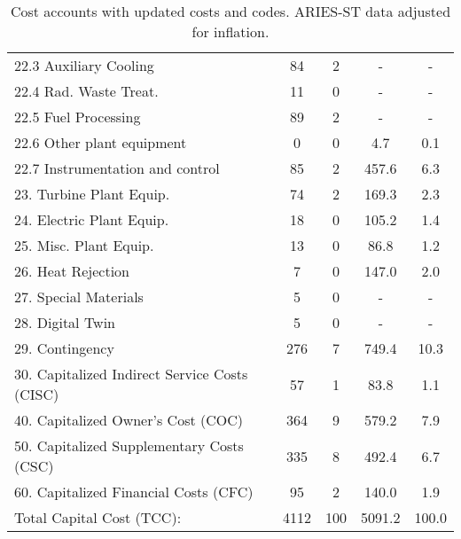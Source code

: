 \begin{table}[h!]
{\begin{tabular}{lcccc}
\hspace{10mm}22.3 Auxiliary Cooling & 84 & 2 & - & - \\
\hspace{10mm}22.4 Rad. Waste Treat. & 11 & 0 & - & - \\
\hspace{10mm}22.5 Fuel Processing & 89 & 2 & - & - \\
\hspace{10mm}22.6 Other plant equipment & 0 & 0 & 4.7 & 0.1 \\
\hspace{10mm}22.7 Instrumentation and control & 85 & 2 & 457.6 & 6.3 \\
\hspace{5mm}23. Turbine Plant Equip. & 74 & 2 & 169.3 & 2.3 \\
\hspace{5mm}24. Electric Plant Equip. & 18 & 0 & 105.2 & 1.4 \\
\hspace{5mm}25. Misc. Plant Equip. & 13 & 0 & 86.8 & 1.2 \\
\hspace{5mm}26. Heat Rejection & 7 & 0 & 147.0 & 2.0 \\
\hspace{5mm}27. Special Materials & 5 & 0 & - & - \\
\hspace{5mm}28. Digital Twin & 5 & 0 & - & - \\
\hspace{5mm}29. Contingency & 276 & 7 & 749.4 & 10.3 \\
30. Capitalized Indirect Service Costs (CISC) & 57 & 1 & 83.8 & 1.1 \\
40. Capitalized Owner’s Cost (COC) & 364 & 9 & 579.2 & 7.9 \\
50. Capitalized Supplementary Costs (CSC) & 335 & 8 & 492.4 & 6.7 \\
60. Capitalized Financial Costs (CFC) & 95 & 2 & 140.0 & 1.9 \\
\hline
Total Capital Cost (TCC): & 4112 & 100 & 5091.2 & 100.0 \\
\hline
\end{tabular}
}
\caption{Cost accounts with updated costs and codes. ARIES-ST data adjusted for inflation.}
\label{tab:costs_updated_codes}
\end{table}


